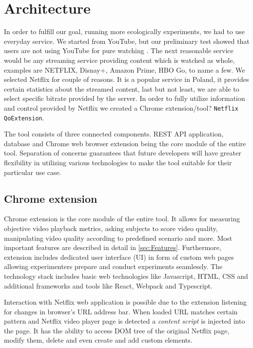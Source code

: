 \newpage
\section{Architecture}
\label{sec:architecture}
    In order to fulfill our goal, running more ecologically experiments, we had to use everyday service. We started from YouTube, but our preliminary test showed that users are not using YouTube for pure watching \cite{}. The next reasonable service would be any streaming service providing content which is watched as whole, examples are NETFLIX, Disnay+, Amazon Prime, HBO Go, to name a few. We selected Netflix for couple of reasons. It is a popular service in Poland, it provides certain statistics about the streamed content, last but not least, we are able to select specific bitrate provided by the server. In order to fully utilize information and control provided by Netflix we created a Chrome extension/tool? \verb|Netflix QoExtension|. 
    
    The tool consists of three connected components. REST API application, database and Chrome web browser extension being the core module of the entire tool. 
    Separation of concerns guarantees that future developers will have greater flexibility in utilizing various technologies to make the tool suitable for their particular use case.
    
    

    \subsection{Chrome extension}
        Chrome extension is the core module of the entire tool. It allows for measuring objective video playback metrics, asking subjects to score video quality, manipulating video quality according to predefined scenario and more. Most important features are described in detail in \ref{sec:Features}.
        Furthermore, extension includes dedicated user interface (UI) in form of custom web pages allowing experimenters prepare and conduct experiments seamlessly.
        The technology stack includes basic web technologies like Javascript, HTML, CSS and additional frameworks and tools like React, Webpack and Typescript.

        Interaction with Netflix web application is possible due to the extension listening for changes in browser's URL address bar. 
        When loaded URL matches certain pattern and Netflix video player page is detected a \textit{content script} is injected into the page. 
        It has the ability to access DOM tree of the original Netflix page, modify them, delete and even create and add custom elements. 

